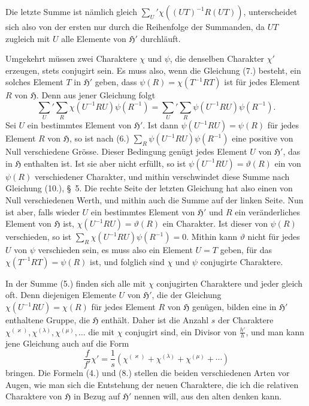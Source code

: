\documentclass[11pt]{article}
\newcommand{\grp}{\mathfrak{H}}
\begin{document}
Die letzte Summe ist nämlich gleich $\sum_U'\chi((UT)^{-1}R(UT))$, unterscheidet sich also von der ersten nur durch die Reihenfolge der Summanden, da $UT$ zugleich mit $U$ alle Elemente von $\grp'$ durchläuft.

Umgekehrt müssen zwei Charaktere $\chi$ und $\psi$, die denselben Charakter $\chi'$ erzeugen, stets conjugirt sein. Es muss also, wenn die Gleichung (7.) besteht, ein solches Element $T$ in $\grp'$ geben, dass $\psi(R)=\chi(T^{-1}RT)$ ist für jedes Element $R$ von $\grp$. Denn aus jener Gleichung folgt
\[
\sum_U'\sum_R \chi(U^{-1}RU)\psi(R^{-1})=\sum_U'\sum_R \psi(U^{-1}RU)\psi(R^{-1}).
\]
Sei $U$ ein bestimmtes Element von $\grp'$. Ist dann $\psi(U^{-1}RU)=\psi(R)$ für jedes Element $R$ von $\grp$, so ist nach (6.) $\sum_R\psi(U^{-1}RU)\psi(R^{-1})$ eine positive von Null verschiedene Grösse. Dieser Bedingung genügt jedes Element $U$ von $\grp'$, das in $\grp$ enthalten ist. Ist sie aber nicht erfüllt, so ist $\psi(U^{-1}RU)=\vartheta(R)$ ein von $\psi(R)$ verschiedener Charakter, und mithin verschwindet diese Summe nach Gleichung (10.), \S~5. Die rechte Seite der letzten Gleichung hat also einen von Null verschiedenen Werth, und mithin auch die Summe auf der linken Seite. Nun ist aber, falls wieder $U$ ein bestimmtes Element von $\grp'$ und $R$ ein veränderliches Element von $\grp$ ist, $\chi(U^{-1}RU)=\vartheta(R)$ ein Charakter. Ist dieser von $\psi(R)$ verschieden, so ist $\sum_R\chi(U^{-1}RU)\psi(R^{-1})=0$. Mithin kann $\vartheta$ nicht für jedes $U$ von $\psi$ verschieden sein, es muss also ein Element $U=T$ geben, für das $\chi(T^{-1}RT)=\psi(R)$ ist, und folglich sind $\chi$ und $\psi$ conjugirte Charaktere.

In der Summe (5.) finden sich alle mit $\chi$ conjugirten Charaktere und jeder gleich oft. Denn diejenigen Elemente $U$ von $\grp'$, die der Gleichung $\chi(U^{-1}RU)=\chi(R)$ für jedes Element $R$ von $\grp$ genügen, bilden eine in $\grp'$ enthaltene Gruppe, die $\grp$ enthält. Daher ist die Anzahl $s$ der Charaktere $\chi^{(\varkappa)},\chi^{(\lambda)},\chi^{(\mu)},\ldots$ die mit $\chi$ conjugirt sind, ein Divisor von $\frac{h'}{h}$, und man kann jene Gleichung auch auf die Form
\begin{equation*}\tag{8.}
\frac{f}{f'}\chi'=\frac{1}{s}(\chi^{(\varkappa)}+\chi^{(\lambda)}+\chi^{(\mu)}+\cdots)
\end{equation*}
bringen. Die Formeln (4.) und (8.) stellen die beiden verschiedenen Arten vor Augen, wie man sich die Entstehung der neuen Charaktere, die ich die relativen Charaktere von $\grp$ in Bezug auf $\grp'$ nennen will, aus den alten denken kann.
\end{document}
